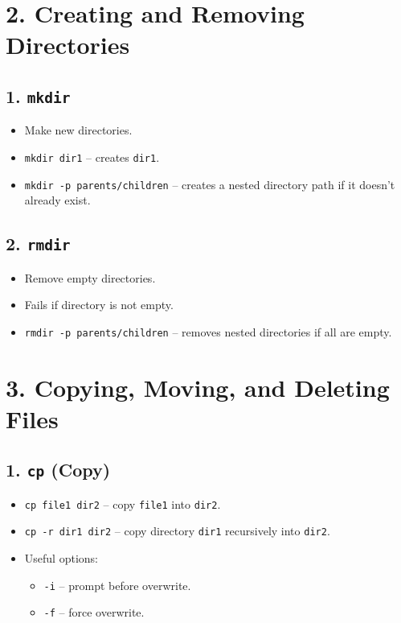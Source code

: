 \documentclass[a4paper]{report}
\begin{document}
\section*{2. Creating and Removing Directories}
\subsection*{1. \texttt{mkdir}}
\begin{itemize}
    \item Make new directories.
    \item \texttt{mkdir dir1} -- creates \texttt{dir1}.
    \item \texttt{mkdir -p parents/children} -- creates a nested directory path if it doesn’t already exist.
\end{itemize}

\subsection*{2. \texttt{rmdir}}
\begin{itemize}
    \item Remove empty directories.
    \item Fails if directory is not empty.
    \item \texttt{rmdir -p parents/children} -- removes nested directories if all are empty.
\end{itemize}

\section*{3. Copying, Moving, and Deleting Files}
\subsection*{1. \texttt{cp} (Copy)}
\begin{itemize}
    \item \texttt{cp file1 dir2} -- copy \texttt{file1} into \texttt{dir2}.
    \item \texttt{cp -r dir1 dir2} -- copy directory \texttt{dir1} recursively into \texttt{dir2}.
    \item Useful options:
    \begin{itemize}
        \item \texttt{-i} -- prompt before overwrite.
        \item \texttt{-f} -- force overwrite.
    \end{itemize}
\end{itemize}
\end{document}
